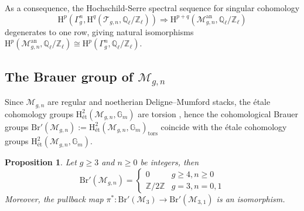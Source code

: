 \documentclass[12pt]{amsart}
\newtheorem{proposition}{Proposition}
\begin{document}
As a consequence, the Hochschild-Serre spectral sequence for singular cohomology $$\mathrm{H}^p(\Gamma_g^n,\mathrm{H}^q(\mathcal{T}_{g,n},\mathbb{Q}_\ell/\mathbb{Z}_\ell))\Rightarrow \mathrm{H}^{p+q}(\mathcal{M}_{g,n}^{\mathrm{an}},\mathbb{Q}_\ell/\mathbb{Z}_\ell)$$
degenerates to one row, giving natural isomorphisms $\mathrm{H}^p(\mathcal{M}_{g,n}^{\mathrm{an}},\mathbb{Q}_\ell/\mathbb{Z}_\ell)\cong\mathrm{H}^p(\Gamma_g^n,\mathbb{Q}_\ell/\mathbb{Z}_\ell).$



\subsection{The Brauer group of $\mathcal{M}_{g,n}$}\label{2.3}Since $\mathcal{M}_{g,n}$ are regular and noetherian Deligne--Mumford stacks, the \'etale cohomology groups $\mathrm{H}_{\textrm{\'et}}^2(\mathcal{M}_{g,n},\mathbb{G}_m)$ are torsion \cite[Theorem 2.5(iii)]{zbMATH07275229}, hence the cohomological Brauer groups $\mathrm{Br}'(\mathcal{M}_{g,n}):=\mathrm{H}^2_{\textrm{\'et}}(\mathcal{M}_{g,n},\mathbb{G}_m)_{\textrm{tors}}$ coincide with the \'etale cohomology groups
$\mathrm{H}^2_{\textrm{\'et}}(\mathcal{M}_{g,n},\mathbb{G}_m).$
\begin{proposition}\label{vanishing-brauer}
Let $g\geq3$ and $n\geq0$ be integers, then $$\mathrm{Br}'(\mathcal{M}_{g,n})=\left\{\begin{array}{cl}0&g\geq4,n\geq0\\ \mathbb{Z}/2\mathbb{Z}&g=3,n=0,1\end{array}\right.$$
Moreover, the pullback map $\pi^*\colon\mathrm{Br}'(\mathcal{M}_3)\to\mathrm{Br}'(\mathcal{M}_{3,1})$ is an isomorphism.
\end{proposition}
\end{document}
